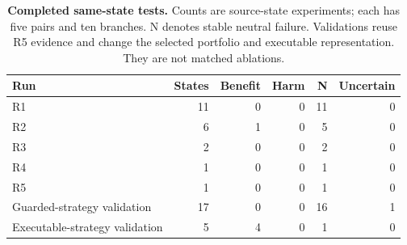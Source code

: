 \begin{table}[!htbp]
\caption{\textbf{Completed same-state tests.} Counts are source-state
experiments; each has five pairs and ten branches. N denotes stable
neutral failure. Validations reuse R5 evidence and change the selected
portfolio and executable representation. They are not matched ablations.}
\label{tab:verification}\centering\small
\begin{tabular}{lrrrrr}\toprule
Run & States & Benefit & Harm & N & Uncertain\\\midrule
R1 & 11 & 0 & 0 & 11 & 0\\
R2 & 6 & 1 & 0 & 5 & 0\\
R3 & 2 & 0 & 0 & 2 & 0\\
R4 & 1 & 0 & 0 & 1 & 0\\
R5 & 1 & 0 & 0 & 1 & 0\\\midrule
Guarded-strategy validation & 17 & 0 & 0 & 16 & 1\\
Executable-strategy validation & 5 & 4 & 0 & 1 & 0\\\bottomrule
\end{tabular}
\end{table}
